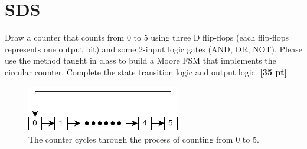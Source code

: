 \documentclass[a4paper]{article}
\begin{document}
\section{SDS}
Draw a counter that counts from 0 to 5 using three D flip-flops (each flip-flops represents one output bit) and some 2-input logic gates (AND, OR, NOT). Please use the method taught in class to build a Moore FSM that implements the circular counter. Complete the state transition logic and output logic. \textbf{[35 pt]}
\begin{figure}[hp]
    \centering
    \includegraphics[height=2cm]{q2.png}
    \caption{The counter cycles through the process of counting from 0 to 5.}
    \label{fig:q2}
\end{figure}
\end{document}
